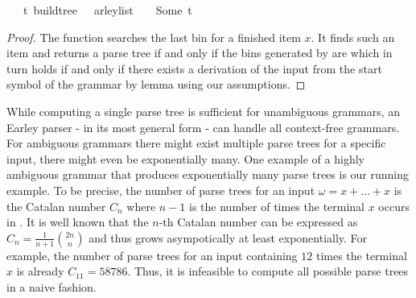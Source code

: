 \begin{isabellebody}
\ \ \ {\isachardoublequoteopen}{\isacharparenleft}{\kern0pt}{\isasymexists}t{\isachardot}{\kern0pt}\ build{\isacharunderscore}{\kern0pt}tree\ {\isasymG}\ {\isasymomega}\ {\isacharparenleft}{\kern0pt}{\isasymE}arley{\isacharunderscore}{\kern0pt}list\ {\isasymG}\ {\isasymomega}{\isacharparenright}{\kern0pt}\ {\isacharequal}{\kern0pt}\ Some\ t{\isacharparenright}{\kern0pt}\ {\isasymlongleftrightarrow}\ {\isasymG}\ {\isasymturnstile}\ {\isacharbrackleft}{\kern0pt}{\isasymSS}\ {\isasymG}{\isacharbrackright}{\kern0pt}\ {\isasymRightarrow}\isactrlsup {\isacharasterisk}{\kern0pt}\ {\isasymomega}{\isachardoublequoteclose}%
\isadelimproof
%
\endisadelimproof
%
\isatagproof
%
\endisatagproof
{\isafoldproof}%
%
\isadelimproof
%
\endisadelimproof
%
\begin{isamarkuptext}%
\begin{proof}

The function  searches the last bin for a finished item $x$.
It finds such an item and returns a parse tree if and only if the bins generated
by  are  which in turn holds if and only if
there exists a derivation of the input from the start symbol of the grammar by
lemma  using our assumptions.

\end{proof}%
\end{isamarkuptext}\isamarkuptrue%
%
\isadelimdocument
%
\endisadelimdocument
%
\isatagdocument
%
\isamarkuptrue%
%
\endisatagdocument
{\isafolddocument}%
%
\isadelimdocument
%
\endisadelimdocument
%
\begin{isamarkuptext}%
While computing a single parse tree is sufficient for unambiguous grammars, an Earley parser - in its most general form -
can handle all context-free grammars. For ambiguous grammars there might exist multiple
parse trees for a specific input, there might even be exponentially many. One example of a highly ambiguous
grammar that produces exponentially many parse trees is our running example. To be precise, the number of
parse trees for an input $\omega = x + \dots + x$ is the Catalan number $C_n$ where $n-1$ is the
number of times the terminal $x$ occurs in \isa{{\isasymomega}}. It is well known that the $n$-th Catalan number can be expressed as
$C_n = \frac{1}{n+1} \binom{2n}{n}$ and thus grows asympotically at least exponentially. For example, the number of parse trees for an input \isa{{\isasymomega}} containing
$12$ times the terminal $x$ is already $C_{11} = 58786$. Thus, it is infeasible to compute all possible
parse trees in a naive fashion.


\end{isamarkuptext}
\end{isabellebody}
